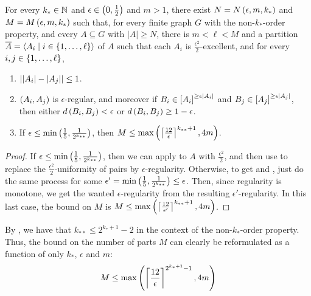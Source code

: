     \begin{theorem}[Theorem 5.19] \label{thm:existance_of_regular_partitions}
        For every $k_* \in \mathbb{N}$ and $\epsilon \in \left( 0, \frac{1}{2} \right)$ and $m > 1$, there exist $N = N\left( \epsilon, m, k_* \right)$
        and $M = M\left( \epsilon, m, k_* \right)$ such that, for every finite graph $G$ with the non-$k_{*}$-order property,
        and every $A \subseteq G$ with $|A| \geq N$, there is $m < \ell < M$ and a partition
        $\overline{A} = \left< A_i \mid i \in \left\{ 1, \dots, \ell \right\} \right>$ of $A$ such that each $A_i$ is
        $\frac{\epsilon^2}{2}$-excellent, and for every $i, j \in \left\{ 1, \dots, \ell \right\}$,
        \begin{enumerate}
            \item \label{itm:existance_of_regular_partitions.1} $\left| \left| A_i \right|- \left| A_j \right| \right| \leq 1$.
            \item \label{itm:existance_of_regular_partitions.2} $\left( A_i, A_j \right)$ is $\epsilon$-regular, and moreover if
                $B_i \in \left[ A_i \right]^{\geq \epsilon \left| A_i \right|}$ and $B_j \in \left[ A_j \right]^{\geq \epsilon \left| A_j \right|}$,
                then either $d\left( B_i, B_j \right) < \epsilon$ or $d\left( B_i, B_j \right) \geq 1 - \epsilon$.
            \item \label{itm:existance_of_regular_partitions.3} If $\epsilon \leq \min \left( \frac{1}{5}, \frac{1}{2^{k_{**}}} \right)$, then
                $M \leq \max \left( \left\lceil \frac{12}{\epsilon} \right\rceil^{k_{**}+1}, 4m \right)$.
        \end{enumerate}
        \begin{proof}
            If $\epsilon \leq \min \left( \frac{1}{5}, \frac{1}{2^{k_{**}}} \right)$, then we can apply 
            to $A$ with $\frac{\epsilon^2}{2}$, and then use  to replace the
            $\frac{\epsilon^2}{2}$-uniformity of pairs by $\epsilon$-regularity.
            Otherwise, to get  and ,
            just do the same process for some $\epsilon' = \min \left( \frac{1}{5}, \frac{1}{2^{k_{**}}} \right) \leq \epsilon$.
            Then, since regularity is monotone, we get the wanted $\epsilon$-regularity from the resulting $\epsilon'$-regularity.
            In this last case, the bound on $M$ is $M \leq \max \left( \left\lceil \frac{12}{\epsilon'} \right\rceil^{k_{**}+1}, 4m \right)$.
        \end{proof}
    \end{theorem}

    \begin{remark}
        By , we have that $k_{**} \leq 2^{k_* + 1}-2$ in the context of the non-$k_*$-order
        property.
        Thus, the bound on the number of parts $M$ can clearly be reformulated as a function of only $k_*$, $\epsilon$ and $m$:
        \[
            M \leq \max \left( \left\lceil \frac{12}{\epsilon} \right\rceil^{2^{k_* + 1}-1}, 4m \right)
        \]
    \end{remark}




